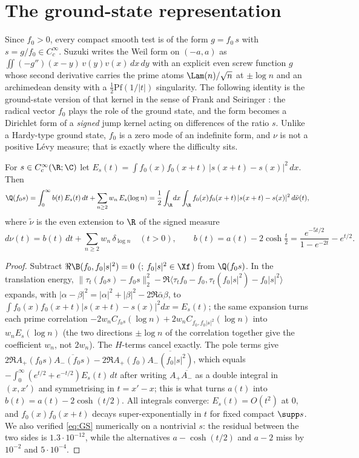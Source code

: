 \section{The ground-state representation}\label{sec:gs}

Since $f_0>0$, every compact smooth test is of the form $g=f_0\,s$ with $s=g/f_0\in C_c^\infty$. Suzuki
\cite[\S2.5]{Suzuki2026} writes the Weil form on $(-a,a)$ as $\iint(-g'')(x-y)\,v(y)v(x)\,dx\,dy$ with an explicit even screw function $g$
whose second derivative carries the prime atoms $\Lam(n)/\sqrt n$ at $\pm\log n$ and an archimedean density with a
$\tfrac12\mathrm{Pf}(1/|t|)$ singularity. The following identity is the ground-state version of that kernel in the sense of Frank and
Seiringer \cite{FrankSeiringer2008}: the radical vector $f_0$ plays the role of the ground state, and the form becomes a
Dirichlet form of a \emph{signed} jump kernel acting on differences of the ratio $s$. Unlike a Hardy-type ground state, $f_0$ is a
zero mode of an indefinite form, and $\nu$ is not a positive L\'evy measure; that is exactly where the difficulty sits.

\begin{theorem}\label{thm:GS}
For $s\in C_c^\infty(\R;\C)$ let $E_s(t)=\int f_0(x)f_0(x+t)\,|s(x+t)-s(x)|^2\,dx$. Then
\begin{equation}\label{eq:GS}
 \Q(f_0s)=\int_0^\infty b(t)\,E_s(t)\,dt+\sum_{n\ge2}w_n\,E_s(\log n)
        =\frac12\int_{\R}\!dx\int_{\R}f_0(x)f_0(x+t)\,|s(x+t)-s(x)|^2\,d\tilde\nu(t),
\end{equation}
where $\tilde\nu$ is the even extension to $\R$ of the signed measure
\begin{equation}\label{eq:nu}
 d\nu(t)=b(t)\,dt+\sum_{n\ge2}w_n\,\delta_{\log n}\quad(t>0),\qquad
 b(t)=a(t)-2\cosh\tfrac t2=\frac{e^{-5t/2}}{1-e^{-2t}}-e^{t/2}.
\end{equation}
\end{theorem}
\begin{proof}
Subtract $\Re\B(f_0,f_0|s|^2)=0$ (; $f_0|s|^2\in\Xf$) from $\Q(f_0s)$. In the translation energy,
$\|\tau_t(f_0s)-f_0s\|_2^2-\Re\langle\tau_t f_0-f_0,\tau_t(f_0|s|^2)-f_0|s|^2\rangle$ expands, with $|\alpha-\beta|^2=|\alpha|^2+|\beta|^2-2\Re\bar\alpha\beta$,
to $\int f_0(x)f_0(x+t)|s(x+t)-s(x)|^2dx=E_s(t)$; the same expansion turns each prime correlation $-2w_nC_{f_0s}(\log n)+2w_nC_{f_0,f_0|s|^2}(\log n)$
into $w_nE_s(\log n)$ (the two directions $\pm\log n$ of the correlation together give the coefficient $w_n$, not $2w_n$). The
$H$-terms cancel exactly. The pole terms give $2\Re A_+(f_0s)\overline{A_-(f_0s)}-2\Re A_+(f_0)\overline{A_-(f_0|s|^2)}$, which equals
$-\int_0^\infty(e^{t/2}+e^{-t/2})E_s(t)\,dt$ after writing $A_+\overline{A_-}$ as a double integral in $(x,x')$ and symmetrising in
$t=x'-x$; this is what turns $a(t)$ into $b(t)=a(t)-2\cosh(t/2)$. All integrals converge: $E_s(t)=O(t^2)$ at $0$, and $f_0(x)f_0(x+t)$ decays
super-exponentially in $t$ for fixed compact $\supp s$. We also verified \eqref{eq:GS} numerically on a nontrivial $s$: the residual
between the two sides is $1.3\cdot10^{-12}$, while the alternatives $a-\cosh(t/2)$ and $a-2$ miss by $10^{-2}$ and $5\cdot10^{-4}$.
\end{proof}

